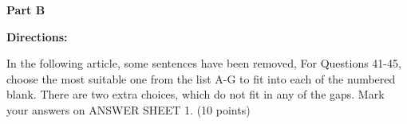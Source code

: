 
\textbf{Part B}

\textbf{Directions:}

In the following article, some sentences have been removed, For Questions 41-45, choose the most suitable one from the list A-G to fit into each of the numbered blank. There are two extra choices, which do not fit in any of the gaps. Mark your answers on ANSWER SHEET 1. (10 points)

\vspace{6pt}